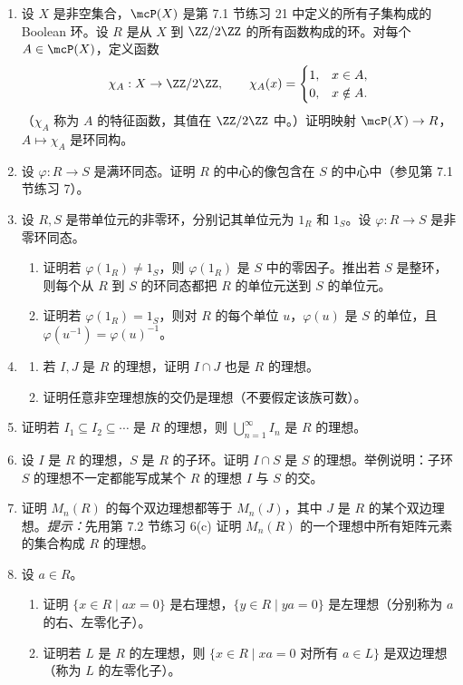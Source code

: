 \begin{enumerate}[label=\arabic*.]
	\item 设 $X$ 是非空集合，$\mcP(X)$ 是第 7.1 节练习 21 中定义的所有子集构成的 Boolean 环。设 $R$ 是从 $X$ 到 $\ZZ/2\ZZ$ 的所有函数构成的环。对每个 $A\in\mcP(X)$，定义函数
	\[
	\chi_A:X\to\ZZ/2\ZZ,
	\qquad
	\chi_A(x)=\begin{cases}1,&x\in A,\\0,&x\notin A.
	\end{cases}
	\]
	（$\chi_A$ 称为 $A$ 的特征函数，其值在 $\ZZ/2\ZZ$ 中。）证明映射 $\mcP(X)\to R$，$A\mapsto\chi_A$ 是环同构。
	\item 设 $\varphi:R\to S$ 是满环同态。证明 $R$ 的中心的像包含在 $S$ 的中心中（参见第 7.1 节练习 7）。
	\item 设 $R,S$ 是带单位元的非零环，分别记其单位元为 $1_R$ 和 $1_S$。设 $\varphi:R\to S$ 是非零环同态。
	\begin{enumerate}[label=(\alph*)]
		\item 证明若 $\varphi(1_R)\neq1_S$，则 $\varphi(1_R)$ 是 $S$ 中的零因子。推出若 $S$ 是整环，则每个从 $R$ 到 $S$ 的环同态都把 $R$ 的单位元送到 $S$ 的单位元。
		\item 证明若 $\varphi(1_R)=1_S$，则对 $R$ 的每个单位 $u$，$\varphi(u)$ 是 $S$ 的单位，且 $\varphi(u^{-1})=\varphi(u)^{-1}$。
	\end{enumerate}
	\item \begin{enumerate}[label=(\alph*)]
		\item 若 $I,J$ 是 $R$ 的理想，证明 $I\cap J$ 也是 $R$ 的理想。
		\item 证明任意非空理想族的交仍是理想（不要假定该族可数）。
	\end{enumerate}
	\item 证明若 $I_1\subseteq I_2\subseteq\cdots$ 是 $R$ 的理想，则 $\bigcup_{n=1}^{\infty}I_n$ 是 $R$ 的理想。
	\item 设 $I$ 是 $R$ 的理想，$S$ 是 $R$ 的子环。证明 $I\cap S$ 是 $S$ 的理想。举例说明：子环 $S$ 的理想不一定都能写成某个 $R$ 的理想 $I$ 与 $S$ 的交。
	\item 证明 $M_n(R)$ 的每个双边理想都等于 $M_n(J)$，其中 $J$ 是 $R$ 的某个双边理想。\emph{提示：}先用第 7.2 节练习 6(c) 证明 $M_n(R)$ 的一个理想中所有矩阵元素的集合构成 $R$ 的理想。
	\item 设 $a\in R$。
	\begin{enumerate}[label=(\alph*)]
		\item 证明 $\{x\in R\mid ax=0\}$ 是右理想，$\{y\in R\mid ya=0\}$ 是左理想（分别称为 $a$ 的右、左零化子）。
		\item 证明若 $L$ 是 $R$ 的左理想，则 $\{x\in R\mid xa=0\text{ 对所有 }a\in L\}$ 是双边理想（称为 $L$ 的左零化子）。

\end{enumerate}
\end{enumerate}
